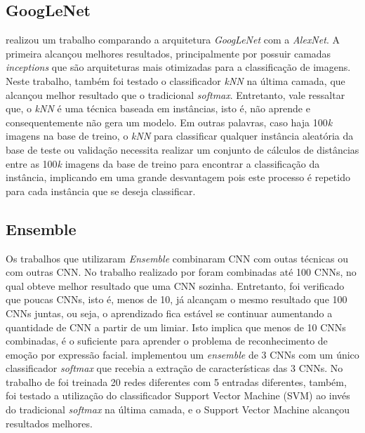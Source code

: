 \subsection{GoogLeNet}
\cite{art10} realizou um trabalho comparando a arquitetura \textit{GoogLeNet} com a \textit{AlexNet}. A primeira alcançou melhores resultados, principalmente por possuir camadas \textit{inceptions} que são arquiteturas mais otimizadas para a classificação de imagens. Neste trabalho, também foi testado o classificador \textit{kNN} na última camada, que alcançou melhor resultado que o tradicional \textit{softmax}. Entretanto, vale ressaltar que, o \textit{kNN} é uma técnica baseada em instâncias, isto é, não aprende e consequentemente não gera um modelo. Em outras palavras, caso haja 100\textit{k} imagens na base de treino, o \textit{kNN} para classificar qualquer instância aleatória da base de teste ou validação necessita realizar um conjunto de cálculos de distâncias entre as 100\textit{k} imagens da base de treino para encontrar a classificação da instância, implicando em uma grande desvantagem pois este processo é repetido para cada instância que se deseja classificar.


\subsection{Ensemble}
Os trabalhos que utilizaram \textit{Ensemble} combinaram CNN com outas técnicas ou com outras CNN. No trabalho realizado por \cite{art3} foram combinadas até 100 CNNs, no qual obteve melhor resultado que uma CNN sozinha. Entretanto, foi verificado que poucas CNNs, isto é, menos de 10, já alcançam o mesmo resultado que 100 CNNs juntas, ou seja, o aprendizado fica estável se continuar aumentando a quantidade de CNN a partir de um limiar. Isto implica que menos de 10 CNNs combinadas, é o suficiente para aprender o problema de reconhecimento de emoção por expressão facial. \cite{art5} implementou um \textit{ensemble} de 3 CNNs com um único classificador \textit{softmax} que recebia a extração de características das 3 CNNs. No trabalho de \cite{art6} foi treinada 20 redes diferentes com 5 entradas diferentes, também, foi testado a utilização do classificador Support Vector Machine (SVM) ao invés do tradicional \textit{softmax} na última camada, e o Support Vector Machine alcançou resultados melhores.

